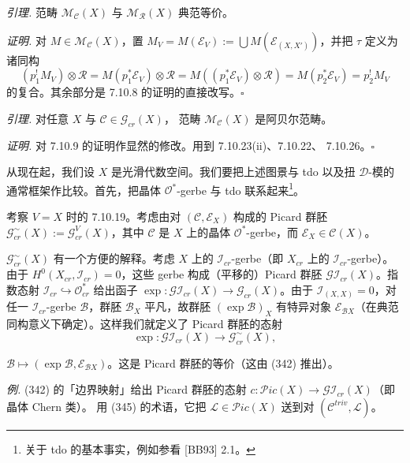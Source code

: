  \emph{引理.} 范畴 $\mathcal{M}_{\mathcal{C}}(X)$ 与
$\mathcal{M}_{\mathcal{R}}(X)$ 典范等价。

\emph{证明.} 对 $M\in\mathcal{M}_{\mathcal{C}}(X)$，置
$M_V=M(\mathcal{E}_V):=\bigcup M(\mathcal{E}_{(X,X')})$，并把 $\tau$ 定义为诸同构
\[
(p_1^{!}M_V)\otimes\mathcal{R}=M(p_1^*\mathcal{E}_V)\otimes\mathcal{R}
=M((p_1^*\mathcal{E}_V)\otimes\mathcal{R})
=M(p_2^*\mathcal{E}_V)=p_2^{!}M_V
\]
的复合。其余部分是 7.10.8 的证明的直接改写。\hfill$\square$

 \emph{引理.} 对任意 $X$ 与 $\mathcal{C}\in\mathcal{G}_{cr}(X)$，
范畴 $\mathcal{M}_{\mathcal{C}}(X)$ 是阿贝尔范畴。

\emph{证明.} 对 7.10.9 的证明作显然的修改。用到 7.10.23(ii)、7.10.22、
7.10.26。\hfill$\square$

 从现在起，我们设 $X$ 是光滑代数空间。我们要把上述图景与 tdo
以及扭 $\mathcal{D}$-模的通常框架作比较。首先，把晶体
$\mathcal{O}^*$-gerbe 与 tdo 联系起来\footnote{关于 tdo 的基本事实，例如参看
[BB93] 2.1。}。

考察 $V=X$ 时的 7.10.19。考虑由对 $(\mathcal{C},\mathcal{E}_X)$ 构成的
Picard 群胚 $\mathcal{G}^{\sim}_{cr}(X):=\mathcal{G}^{V}_{cr}(X)$，其中
$\mathcal{C}$ 是 $X$ 上的晶体 $\mathcal{O}^*$-gerbe，而
$\mathcal{E}_X\in\mathcal{C}(X)$。

$\mathcal{G}^{\sim}_{cr}(X)$ 有一个方便的解释。考虑 $X$ 上的
$\mathcal{I}_{cr}$-gerbe（即 $X_{cr}$ 上的 $\mathcal{I}_{cr}$-gerbe）。由于
$H^0(X_{cr},\mathcal{I}_{cr})=0$，这些 gerbe 构成（平移的）Picard 群胚
$\mathcal{G}\mathcal{I}_{cr}(X)$。指数态射
$\mathcal{I}_{cr}\hookrightarrow\mathcal{O}^*_{cr}$ 给出函子
$\exp:\mathcal{G}\mathcal{I}_{cr}(X)\to\mathcal{G}_{cr}(X)$。由于
$\mathcal{I}_{(X,X)}=0$，对任一 $\mathcal{I}_{cr}$-gerbe $\mathcal{B}$，群胚
$\mathcal{B}_X$ 平凡，故群胚 $(\exp\mathcal{B})_X$ 有特异对象
$\mathcal{E}_{\mathcal{B}X}$（在典范同构意义下确定）。这样我们就定义了 Picard
群胚的态射
\begin{equation}\tag{345}
\exp:\mathcal{G}\mathcal{I}_{cr}(X)\longrightarrow \mathcal{G}^{\sim}_{cr}(X),
\end{equation}


$\mathcal{B}\mapsto(\exp\mathcal{B},\mathcal{E}_{\mathcal{B}X})$。这是 Picard
群胚的等价（这由 (342) 推出）。

\emph{例.} (342) 的「边界映射」给出 Picard 群胚的态射
$c:\mathcal{P}ic(X)\to\mathcal{G}\mathcal{I}_{cr}(X)$（即晶体 Chern 类）。
用 (345) 的术语，它把 $\mathcal{L}\in\mathcal{P}ic(X)$ 送到对
$(\mathcal{C}^{triv},\mathcal{L})$。

